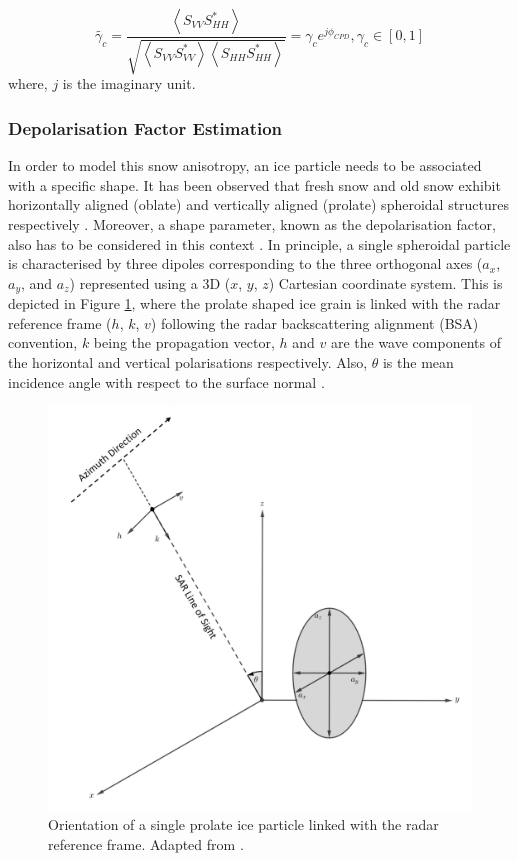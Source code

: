 \documentclass[review]{elsarticle}
\numberwithin{equation}{section}
\numberwithin{figure}{section}
\numberwithin{table}{section}
\begin{document}
\begin{equation}
    \label{eq:2}
    \widetilde{\gamma_c} = \frac{\left\langle S_{VV}S_{HH}^*\right\rangle}{\sqrt{\left\langle S_{VV}S_{VV}^*\right\rangle\left\langle S_{HH}S_{HH}^*\right\rangle}} = \gamma_ce^{j\phi_{CPD}}, \gamma_c \in [0, 1]
\end{equation}
where, $j$ is the imaginary unit. 
\subsubsection{Depolarisation Factor Estimation}

In order to model this snow anisotropy, an ice particle needs to be associated with a specific shape. It has been observed that fresh snow and old snow exhibit horizontally aligned (oblate) and vertically aligned (prolate) spheroidal structures respectively \citep{Leinss2014}. Moreover, a shape parameter, known as the depolarisation factor, also has to be considered in this context \citep{Leinss2014, Sihvola1999}. In principle, a single spheroidal particle is characterised by three dipoles corresponding to the three orthogonal axes ($a_x$, $a_y$, and $a_z$) represented using a 3D ($x$, $y$, $z$) Cartesian coordinate system. This is depicted in Figure \ref{fig:prolate}, where the prolate shaped ice grain is linked with the radar reference frame ($h$, $k$, $v$) following the radar backscattering alignment (BSA) convention, $k$ being the propagation vector, $h$ and $v$ are the wave components of the horizontal and vertical polarisations respectively. Also, $\theta$ is the mean incidence angle with respect to the surface normal \citep{Leinss2014, Parrella2013}. 

\begin{figure}[htb]
    \centering
    \includegraphics[width=\textwidth]{Figures/Prolate_New.png}
    \caption{Orientation of a single prolate ice particle linked with the radar reference frame. Adapted from \cite{Leinss2014}.}
    \label{fig:prolate}
\end{figure}
\end{document}
